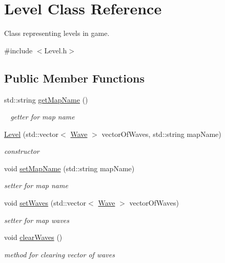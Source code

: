 \hypertarget{class_level}{}\section{Level Class Reference}
\label{class_level}


Class representing levels in game.  




{\ttfamily \#include $<$Level.\+h$>$}

\subsection*{Public Member Functions}
\begin{DoxyCompactItemize}
\item 
\mbox{\label{class_level_a3319abe5123ed42bb6632015656d4df7}} 
std\+::string \mbox{\hyperlink{class_level_a3319abe5123ed42bb6632015656d4df7}{get\+Map\+Name}} ()
\begin{DoxyCompactList}\small\item\em ~\newline
getter for map name \end{DoxyCompactList}\item 
\mbox{\hyperlink{class_level_ac3219336ec0edadd14e4c8bd012ede11}{Level}} (std\+::vector$<$ \mbox{\hyperlink{class_wave}{Wave}} $>$ vector\+Of\+Waves, std\+::string map\+Name)
\begin{DoxyCompactList}\small\item\em constructor \end{DoxyCompactList}\item 
void \mbox{\hyperlink{class_level_af30bbc6f28d1373854c316a8226503ba}{set\+Map\+Name}} (std\+::string map\+Name)
\begin{DoxyCompactList}\small\item\em setter for map name \end{DoxyCompactList}\item 
void \mbox{\hyperlink{class_level_adc3fb45bf2db8c85e60a6496d8bb5d0c}{set\+Waves}} (std\+::vector$<$ \mbox{\hyperlink{class_wave}{Wave}} $>$ vector\+Of\+Waves)
\begin{DoxyCompactList}\small\item\em setter for map waves \end{DoxyCompactList}\item 
void \mbox{\hyperlink{class_level_a8ffc6f7c57173c9399aa8755b4435353}{clear\+Waves}} ()
\begin{DoxyCompactList}\small\item\em method for clearing vector of waves \end{DoxyCompactList}\item 

\end{DoxyCompactItemize}
